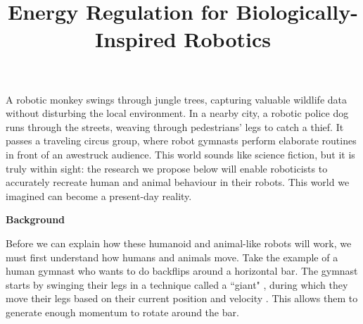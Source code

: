 \documentclass[letterpaper,12pt]{article}
\begin{document}
\title{Energy Regulation for Biologically-Inspired Robotics}
\author{}
\date{}
\maketitle

\vspace{-1.5cm} %

A robotic monkey swings through jungle trees, capturing valuable
wildlife data without disturbing the local environment. 
In a nearby city, a robotic police dog runs through the streets, weaving through
pedestrians' legs to catch a thief.
It passes a traveling circus group, where robot gymnasts perform elaborate
routines in front of an awestruck audience.
This world sounds like science fiction, but it is truly within sight:
the research we propose below will enable roboticists to accurately recreate
human and animal behaviour in their robots.
This world we imagined can become a present-day reality.

\begin{large}
\textbf{Background}
\end{large}

Before we can explain how these humanoid and animal-like robots will work, we
must first understand how humans and animals move. 
Take the example of a human gymnast who  wants to do backflips around a
horizontal bar. 
The gymnast starts by swinging their legs in a technique called a ``giant"
\cite{usagym_giant}, during which they move their legs based on their current
position and velocity \cite{pendulum_length_giant_gymnastics}. 
This allows them to generate enough momentum to rotate around the bar.
\end{document}
